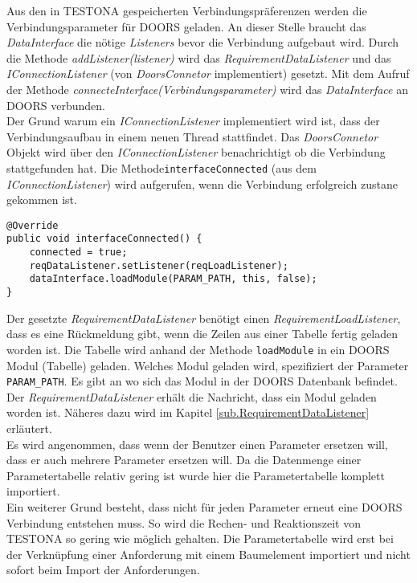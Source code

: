 Aus den in TESTONA gespeicherten Verbindungspräferenzen werden die Verbindungsparameter für DOORS geladen. An dieser Stelle braucht das \textit{DataInterface} die nötige \textit{Listeners} bevor die Verbindung aufgebaut wird. Durch die Methode \textit{addListener(listener)} wird das \textit{RequirementDataListener} und das \textit{IConnectionListener} (von \textit{DoorsConnetor} implementiert) gesetzt. Mit dem Aufruf der Methode \textit{connecteInterface(Verbindungsparameter)} wird das \textit{DataInterface} an DOORS verbunden.\\

Der Grund warum ein \textit{IConnectionListener} implementiert wird ist, dass der Verbindungsaufbau in einem neuen Thread stattfindet. Das \textit{DoorsConnetor} Objekt wird über den \textit{IConnectionListener} benachrichtigt ob die Verbindung stattgefunden hat. Die Methode\texttt{interfaceConnected} (aus dem \textit{IConnectionListener}) wird aufgerufen, wenn die Verbindung erfolgreich zustane gekommen ist.

\begin{lstlisting}[caption={Verbindungsaufbau war erfolgreich}, captionpos=b]
@Override
public void interfaceConnected() {
	connected = true;
	reqDataListener.setListener(reqLoadListener);
	dataInterface.loadModule(PARAM_PATH, this, false);
}
\end{lstlisting}

Der gesetzte \textit{RequirementDataListener} benötigt einen \textit{RequirementLoadListener}, dass es eine Rückmeldung gibt, wenn die Zeilen aus einer Tabelle fertig geladen worden ist. Die Tabelle wird anhand der Methode \texttt{loadModule} in ein DOORS Modul (Tabelle) geladen. Welches Modul geladen wird, spezifiziert der Parameter \texttt{PARAM\_PATH}. Es gibt an wo sich das Modul in der DOORS Datenbank befindet. Der \textit{RequirementDataListener} erhält die Nachricht, dass ein Modul geladen worden ist. Näheres dazu wird im Kapitel \ref{sub.RequirementDataListener} erläutert.\\


Es wird angenommen, dass wenn der Benutzer einen Parameter ersetzen will, dass er auch mehrere Parameter ersetzen will. Da die Datenmenge einer Parametertabelle relativ gering ist wurde hier die Parametertabelle komplett importiert. \\


Ein weiterer Grund besteht, dass nicht für jeden Parameter erneut eine DOORS Verbindung entstehen muss. So wird die Rechen- und Reaktionszeit von TESTONA so gering wie möglich gehalten. Die Parametertabelle wird erst bei der Verknüpfung einer Anforderung mit einem Baumelement importiert und nicht sofort beim Import der Anforderungen. 

